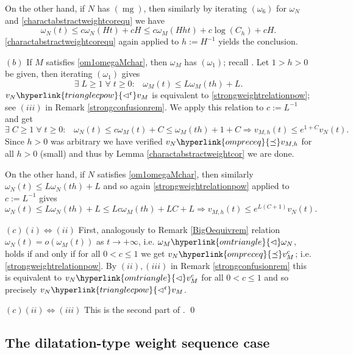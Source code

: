 \documentclass[10pt]{amsart}%
\numberwithin{equation}{section}
\theoremstyle{plain}
\let\on=\operatorname
\begin{document}
On the other hand, if $N$ has \hyperlink{mg}{$(\on{mg})$}, then similarly by iterating \hyperlink{om6}{$(\omega_6)$} for $\omega_N$ and \eqref{charactabstractweightcorequ} we have
$$\omega_N(t)\le c\omega_N(Ht)+cH\le c\omega_M(Hht)+c\log(C_h)+cH.$$
\eqref{charactabstractweightcorequ} again applied to $h:=H^{-1}$ yields the conclusion.\vspace{6pt}

$(b)$ If $M$ satisfies \eqref{om1omegaMchar}, then $\omega_M$ has \hyperlink{om1}{$(\omega_1)$}; recall \cite[Thm. 3.1]{subaddlike}. Let $1>h>0$ be given, then iterating \hyperlink{om1}{$(\omega_1)$} gives
$$\exists\;L\ge 1\;\forall\;t\ge 0:\;\;\;\omega_M(t)\le L\omega_M(th)+L.$$
$v_N\hyperlink{trianglecpow}{\vartriangleleft^{\mathfrak{c}}}v_M$ is equivalent to \eqref{strongweightrelationpow}; see $(iii)$ in Remark \ref{strongconfusionrem}. We apply this relation to $c:=L^{-1}$ and get
$$\exists\;C\ge 1\;\forall\;t\ge 0:\;\;\;\omega_N(t)\le c\omega_M(t)+C\le\omega_M(th)+1+C\Longrightarrow v_{M,h}(t)\le e^{1+C}v_N(t).$$
Since $h>0$ was arbitrary we have verified $v_N\hyperlink{ompreceq}{\preceq}v_{M,h}$ for all $h>0$ (small) and thus by Lemma \ref{charactabstractweightcor} we are done.

On the other hand, if $N$ satisfies \eqref{om1omegaMchar}, then similarly $\omega_N(t)\le L\omega_N(th)+L$ and so again \eqref{strongweightrelationpow} applied to $c:=L^{-1}$ gives
$$\omega_N(t)\le L\omega_N(th)+L\le Lc\omega_M(th)+LC+L\Longrightarrow v_{M,h}(t)\le e^{L(C+1)}v_N(t).$$

$(c)(i)\Leftrightarrow(ii)$ First, analogously to
Remark \ref{BigOequivrem} relation $\omega_N(t)=o(\omega_M(t))$ as $t\rightarrow+\infty$, i.e. $\omega_M\hyperlink{omtriangle}{\vartriangleleft}\omega_N$, holds if and only if for all $0<c\le 1$ we get $v_N\hyperlink{ompreceq}{\preceq}v_M^c$; i.e. \eqref{strongweightrelationpow}. By $(ii),(iii)$ in Remark \ref{strongconfusionrem} this is equivalent to $v_N\hyperlink{omtriangle}{\vartriangleleft}v_M^c$ for all $0<c\le 1$ and so precisely $v_N\hyperlink{trianglecpow}{\vartriangleleft^{\mathfrak{c}}}v_M$.\vspace{6pt}

$(c)(ii)\Leftrightarrow(iii)$ This is the second part of \cite[Lemma 6.5]{PTTvsmatrix}.
\qed\enddemo

\subsection{The dilatation-type weight sequence case}\label{strongweightsequsect}
\end{document}
